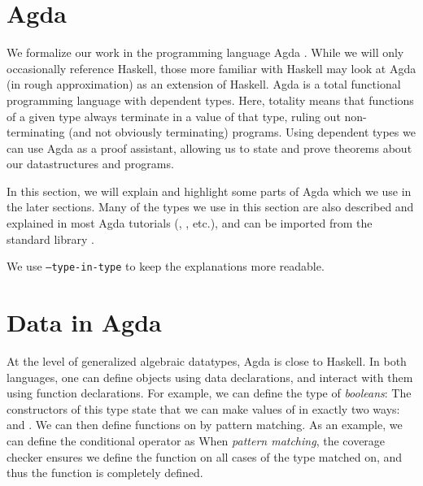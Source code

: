 \section{Agda}\label{sec:background-agda}
We formalize our work in the programming language Agda \cite{agda}. While we will only occasionally reference Haskell, those more familiar with Haskell may look at Agda (in rough approximation) as an extension of Haskell\cite{?}. Agda is a total functional programming language with dependent types. Here, totality means that functions of a given type always terminate in a value of that type, ruling out non-terminating (and not obviously terminating) programs. Using dependent types we can use Agda as a proof assistant, allowing us to state and prove theorems about our datastructures and programs. 

In this section, we will explain and highlight some parts of Agda which we use in the later sections. 
Many of the types we use in this section are also described and explained in most Agda tutorials (\cite{ulftutorial}, \cite{plfa}, etc.), and can be imported from the standard library \cite{agdastdlib}.

We use \texttt{--type-in-type} %
to keep the explanations more readable. %


\section{Data in Agda}\label{sec:background-data}
At the level of generalized algebraic datatypes, Agda is close to Haskell. In both languages, one can define objects using data declarations, and interact with them using function declarations. For example, we can define the type of \emph{booleans}:
The constructors of this type state that we can make values of  in exactly two ways:  and . We can then define functions on  by pattern matching. As an example, we can define the conditional operator as
When \emph{pattern matching}, the coverage checker ensures we define the function on all cases of the type matched on, and thus the function is completely defined. %

